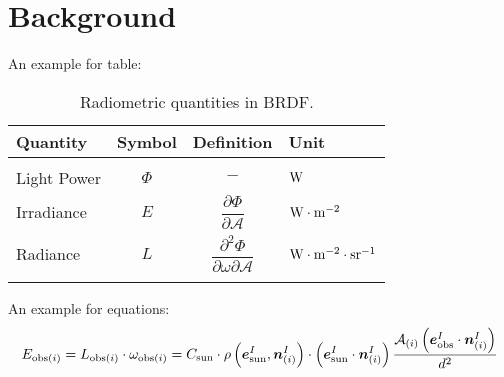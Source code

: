 \chapter{Background}\label{ch:theory}
    An example for table:
    \begin{table}[h!]
        \centering
        \caption{Radiometric quantities in BRDF.}\label{tbl:brdf}
        \begin{tabular}{ l c c l }
            \Xhline{2\arrayrulewidth} 
            \textbf{Quantity} & \textbf{Symbol} & \textbf{Definition} & \textbf{Unit} \\
            \hline \\ [-0.5em]
            Light Power & \(\Phi\) & \(-\) & \(\rm W\) \\ [0.5em]
            Irradiance  & \(E\)    & \(\dfrac{\partial\Phi}{\partial \mathcal{A}}\) & \(\rm W \cdot m^{-2}\) \\ [0.5em]
            Radiance    & \(L\)    & \(\dfrac{\partial^2\Phi}{\partial \omega\partial \mathcal{A}}\) & \(\rm W \cdot m^{-2} \cdot sr^{-1}\) \\ [0.5em]
            \Xhline{2\arrayrulewidth} 
        \end{tabular}
    \end{table}

    An example for equations:
    \begin{equation}
        E_{{\rm obs}(i)} = L_{{\rm obs}(i)} \cdot \omega_{{\rm obs}(i)}
        = C_{\rm sun} \cdot \rho\left(\bm e_{\rm sun}^I , \bm n_{(i)}^I\right) \cdot \left(\bm e_{\rm sun}^I \cdot \bm n_{(i)}^I\right) \dfrac{\mathcal{A}_{(i)} \left(\bm e_{\rm obs}^I \cdot \bm n_{(i)}^I\right)}{d^2}
    \end{equation}

    \lipsum[1-3]